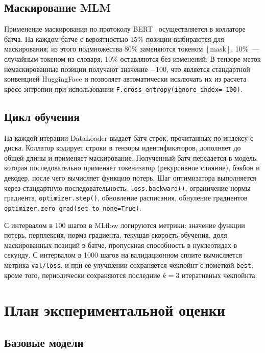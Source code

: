 \subsection{Маскирование MLM}

Применение маскирования по протоколу
BERT~\cite{devlinBERTPretrainingDeep2019} осуществляется в
коллаторе батча. На каждом батче с вероятностью 15\% позиции
выбираются для маскирования; из этого подмножества 80\% заменяются
токеном $[\text{mask}]$, 10\%~--- случайным токеном из словаря, 10\%
оставляются без изменений. В тензоре меток немаскированные позиции
получают значение $-100$, что является стандартной конвенцией
HuggingFace и позволяет автоматически исключать их из расчета
кросс-энтропии при использовании
\texttt{F.cross\_entropy(ignore\_index=-100)}.

\subsection{Цикл обучения}

На каждой итерации DataLoader выдает батч строк, прочитанных по индексу
с диска. Коллатор кодирует строки в тензоры идентификаторов, дополняет
до общей длины и применяет маскирование. Полученный батч передается в
модель, которая последовательно применяет токенизатор (рекурсивное
слияние), бэкбон и декодер, после чего вычисляет функцию потерь. Шаг
оптимизатора выполняется через стандартную последовательность:
\texttt{loss.backward()}, ограничение нормы градиента,
\texttt{optimizer.step()}, обновление расписания, обнуление градиентов
\texttt{optimizer.zero\_grad(set\_to\_none=True)}.

С интервалом в 100 шагов в MLflow логируются метрики: значение функции
потерь, перплексия, норма градиента, текущая скорость обучения, доля
маскированных позиций в батче, пропускная способность в нуклеотидах в
секунду. С интервалом в 1000 шагов на валидационном сплите вычисляется
метрика \texttt{val/loss}, и при ее улучшении сохраняется чекпойнт с
пометкой \texttt{best}; кроме того, периодически сохраняются последние
$k = 3$ итеративных чекпойнта.

\section{План экспериментальной оценки}

\subsection{Базовые модели}

